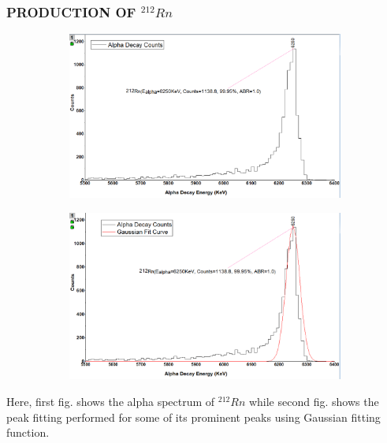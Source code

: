 \documentclass[12pt]{article}
\begin{document}
\subsubsection{PRODUCTION OF $^{212}Rn$}
\begin{figure}[h]
\centering
 \begin{subfigure}
\centering
\includegraphics[scale=0.5]{Rn212.png}
\end{subfigure}
\hfill
\begin{subfigure}
\centering
\includegraphics[scale=0.5]{Rn212(Peak Fitting).png}
\end{subfigure}
\label{First fig shows the alpha spectrum of Rn 212 and second fig shows the peak fitting for its prominent peaks.}
\end{figure}
Here, first fig. shows the alpha spectrum of $^{212}Rn$ while second fig. shows the peak fitting performed for some of its prominent peaks using Gaussian fitting function.
\clearpage
\end{document}
